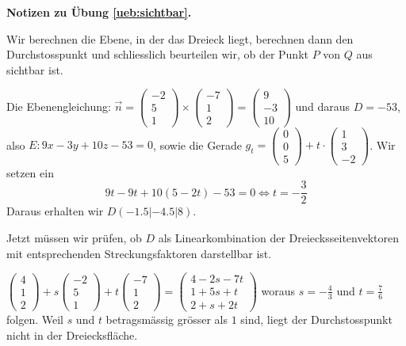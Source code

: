 \documentclass[%
11pt,%
twoside,%
titlepage,%
german,%
headsepline%
]{scrartcl}
\theoremstyle{definition}
\theoremstyle{plain}
\newcommand{\concatueb}[1]{ueb:#1}%
\newcommand{\concatlsg}[1]{lsg:#1}%
\newenvironment{lsg}[1]{%
    \par\noindent\textbf{Notizen zu Übung \ref{\concatueb{#1}}.}%
    \label{\concatlsg{#1}}
}{%
    \par%
}
\begin{document}
\begin{lsg}{sichtbar}
Wir berechnen die Ebene, in der das Dreieck liegt, berechnen dann den Durchstosspunkt und schliesslich beurteilen wir, ob der Punkt $P$ von $Q$ aus sichtbar ist.

Die Ebenengleichung: $\vec{n}=\begin{pmatrix}
    -2\\5\\1
\end{pmatrix}\times\begin{pmatrix}
    -7\\1\\2
\end{pmatrix}=\begin{pmatrix}
    9\\-3\\10
\end{pmatrix}$ und daraus $D=-53$, also $E: 9x-3y+10z-53=0$, sowie die Gerade $g_t=\begin{pmatrix}
    0\\0\\5
\end{pmatrix}+t\cdot\begin{pmatrix}
    1\\3\\-2
\end{pmatrix}$. Wir setzen ein
$$9t-9t+10(5-2t)-53=0\Leftrightarrow t=-\frac{3}{2}$$
Daraus erhalten wir $D(-1.5|-4.5|8)$.

Jetzt müssen wir prüfen, ob $D$ als Linearkombination der Dreiecksseitenvektoren mit entsprechenden Streckungsfaktoren darstellbar ist.

$\begin{pmatrix}
    4\\1\\2
\end{pmatrix}+s\begin{pmatrix}
    -2\\5\\1
\end{pmatrix}+t\begin{pmatrix}
    -7\\1\\2
\end{pmatrix}=\begin{pmatrix}
    4-2s-7t\\1+5s+t\\2+s+2t
\end{pmatrix}$
woraus $s=-\frac{4}{3}$ und $t=\frac{7}{6}$ folgen. Weil $s$ und $t$ betragsmässig grösser als $1$ sind, liegt der Durchstosspunkt nicht in der Dreiecksfläche.
\end{lsg}
\end{document}

